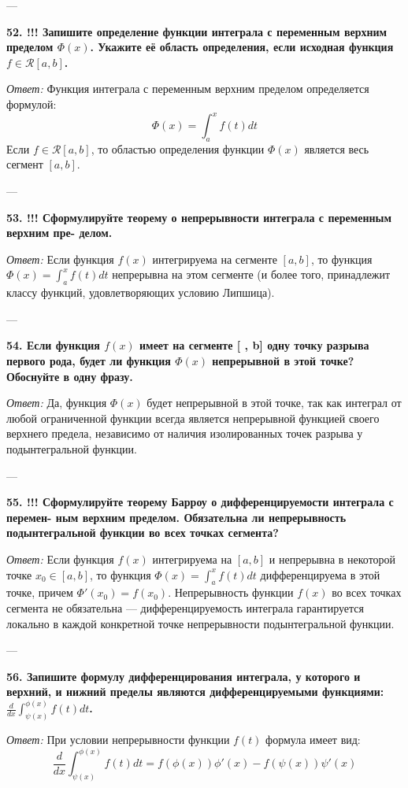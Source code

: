 \documentclass{article}
\begin{document}
---

\textbf{52. !!! Запишите определение функции интеграла с переменным верхним пределом $\Phi(x)$. Укажите её область определения, если исходная функция $f\in\mathcal{R}[a,b]$.}

\textit{Ответ:} Функция интеграла с переменным верхним пределом определяется формулой:
$$ \Phi(x) = \int_a^x f(t) dt $$
Если $f \in \mathcal{R}[a, b]$, то областью определения функции $\Phi(x)$ является весь сегмент $[a, b]$.

---

\textbf{53. !!! Сформулируйте теорему о непрерывности интеграла с переменным верхним пре- делом.}

\textit{Ответ:} Если функция $f(x)$ интегрируема на сегменте $[a, b]$, то функция $\Phi(x) = \int_a^x f(t) dt$ непрерывна на этом сегменте (и более того, принадлежит классу функций, удовлетворяющих условию Липшица).

---

\textbf{54. Если функция $f(x)$ имеет на сегменте [ , b] одну точку разрыва первого рода, будет ли функция $\Phi(x)$ непрерывной в этой точке? Обоснуйте в одну фразу.}

\textit{Ответ:} Да, функция $\Phi(x)$ будет непрерывной в этой точке, так как интеграл от любой ограниченной функции всегда является непрерывной функцией своего верхнего предела, независимо от наличия изолированных точек разрыва у подынтегральной функции.

---

\textbf{55. !!! Сформулируйте теорему Барроу о дифференцируемости интеграла с перемен- ным верхним пределом. Обязательна ли непрерывность подынтегральной функции во всех точках сегмента?}

\textit{Ответ:} Если функция $f(x)$ интегрируема на $[a, b]$ и непрерывна в некоторой точке $x_0 \in [a, b]$, то функция $\Phi(x) = \int_a^x f(t) dt$ дифференцируема в этой точке, причем $\Phi'(x_0) = f(x_0)$. Непрерывность функции $f(x)$ во всех точках сегмента не обязательна — дифференцируемость интеграла гарантируется локально в каждой конкретной точке непрерывности подынтегральной функции.

---

\textbf{56. Запишите формулу дифференцирования интеграла, у которого и верхний, и нижний пределы являются дифференцируемыми функциями: $\frac{d}{dx}\int_{\psi(x)}^{\phi(x)}f(t)dt$.}

\textit{Ответ:} При условии непрерывности функции $f(t)$ формула имеет вид:
$$ \frac{d}{dx}\int_{\psi(x)}^{\phi(x)}f(t)dt = f(\phi(x))\phi'(x) - f(\psi(x))\psi'(x) $$
\end{document}

